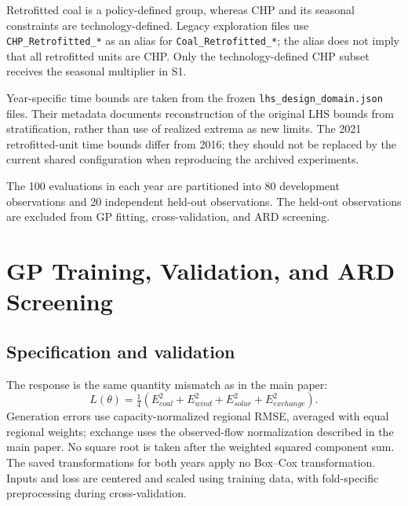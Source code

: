 \documentclass[11pt,a4paper]{article}
\begin{document}
\begin{center}
\label{tab:domain}
\small
\end{center}

Retrofitted coal is a policy-defined group, whereas CHP and its seasonal
constraints are technology-defined. Legacy exploration files use
\texttt{CHP\_Retrofitted\_*} as an alias for
\texttt{Coal\_Retrofitted\_*}; the alias does not imply that all retrofitted
units are CHP. Only the technology-defined CHP subset receives the seasonal
multiplier in S1.

Year-specific time bounds are taken from the frozen
\texttt{lhs\_design\_domain.json} files. Their metadata documents reconstruction
of the original LHS bounds from stratification, rather than use of realized
extrema as new limits. The 2021 retrofitted-unit time bounds differ from 2016;
they should not be replaced by the current shared configuration when
reproducing the archived experiments.

The 100 evaluations in each year are partitioned into 80 development observations
and 20 independent held-out observations. The held-out observations are excluded
from GP fitting, cross-validation, and ARD screening.

\newpage
\section{GP Training, Validation, and ARD Screening}
\subsection{Specification and validation}
The response is the same quantity mismatch as in the main paper:
\begin{equation}
L(\theta)=\tfrac14\left(E_{coal}^2+E_{wind}^2+E_{solar}^2+E_{exchange}^2\right).
\end{equation}
Generation errors use capacity-normalized regional RMSE, averaged with equal
regional weights; exchange uses the observed-flow normalization described
in the main paper. No square root is taken after the weighted squared
component sum. The saved transformations for both years apply no Box--Cox
transformation. Inputs and loss are centered and scaled using training data,
with fold-specific preprocessing during cross-validation.
\end{document}
